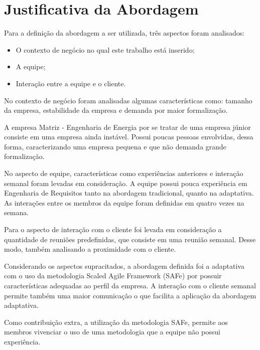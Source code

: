 \chapter[Justificativa]{Justificativa da Abordagem}

Para a definição da abordagem a ser utilizada, três aspectos foram analisados:

\begin{itemize} 
 \item O contexto de negócio no qual este trabalho está inserido;
 \item A equipe;
 \item Interação entre a equipe e o cliente.
\end{itemize}


No contexto de negócio foram analisadas algumas características como: tamanho da empresa,
estabilidade da empresa e demanda por maior formalização.

A empresa Matriz - Engenharia de Energia por se tratar de uma empresa júnior consiste
em uma empresa ainda instável. Possui poucas pessoas envolvidas, dessa forma, caracterizando uma empresa
pequena e que não demanda grande formalização.

No aspecto de equipe, características como experiências anteriores e interação semanal 
foram levadas em consideração. A equipe possui pouca experiência 
em Engenharia de Requisitos tanto na abordagem tradicional, quanto na adaptativa. 
As interações entre os membros da equipe foram definidas em quatro vezes na semana.

Para o aspecto de interação com o cliente foi levada em consideração a quantidade de
reuniões predefinidas, que consiste em uma reunião semanal. Desse modo, também analisando 
a proximidade com o cliente.

Considerando os aspectos supracitados, a abordagem definida foi a adaptativa com o uso da 
metodologia Scaled Agile Framework (SAFe) por possuir características adequadas ao perfil
da empresa. A interação com o cliente semanal permite também uma maior comunicação o que
facilita a aplicação da abordagem adaptativa. 

Como contribuição extra, a utilização da metodologia SAFe, permite aos membros vivenciar
o uso de uma metodologia que a equipe não possui experiência.